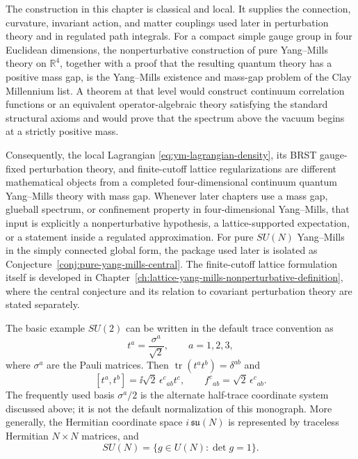 \begin{remark}
\label{rem:four-dimensional-yang-mills-status}
The construction in this chapter is classical and local.  It supplies the
connection, curvature, invariant action, and matter couplings used later in
perturbation theory and in regulated path integrals.  For a compact simple
gauge group in four Euclidean dimensions, the nonperturbative construction of
pure Yang--Mills theory on \(\mathbb R^4\), together with a proof that the
resulting quantum theory has a positive mass gap, is the Yang--Mills
existence and mass-gap problem of the Clay Millennium list.  A theorem at
that level would construct continuum correlation functions or an equivalent
operator-algebraic theory satisfying the standard structural axioms and would
prove that the spectrum above the vacuum begins at a strictly positive mass.

Consequently, the local Lagrangian \eqref{eq:ym-lagrangian-density}, its
BRST gauge-fixed perturbation theory, and finite-cutoff lattice
regularizations are different mathematical objects from a completed
four-dimensional continuum quantum Yang--Mills theory with mass gap.  Whenever
later chapters use a mass gap, glueball spectrum, or confinement property in
four-dimensional Yang--Mills, that input is explicitly a nonperturbative
hypothesis, a lattice-supported expectation, or a statement inside a regulated
approximation.  For pure \(SU(N)\) Yang--Mills in the simply connected global
form, the package used later is isolated as
Conjecture~\ref{conj:pure-yang-mills-central}.
The finite-cutoff lattice formulation itself is developed in
Chapter~\ref{ch:lattice-yang-mills-nonperturbative-definition}, where the
central conjecture and its relation to covariant perturbation theory are
stated separately.
\end{remark}

The basic example \(SU(2)\) can be written in the default trace convention as
\[
  t^a=\frac{\sigma^a}{\sqrt2},\qquad a=1,2,3,
\]
where \(\sigma^a\) are the Pauli matrices.  Then
\(\operatorname{tr}(t^at^b)=\delta^{ab}\) and
\[
  [t^a,t^b]=\ii\sqrt2\,\epsilon^{c}{}_{ab}t^c,
  \qquad
  f^c{}_{ab}=\sqrt2\,\epsilon^{c}{}_{ab}.
\]
The frequently used basis \(\sigma^a/2\) is the alternate half-trace
coordinate system discussed above; it is not the default normalization of this
monograph.  More generally,
the Hermitian coordinate space \(i\,\mathfrak{su}(N)\) is represented by
traceless Hermitian \(N\times N\) matrices, and
\[
  SU(N)=\{g\in U(N):\det g=1\}.
\]

